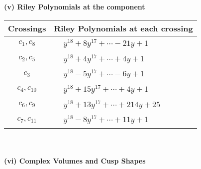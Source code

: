 \documentclass[1p]{elsarticle_modified}
\theoremstyle{definition}
\begin{document}
\newpage\renewcommand{\arraystretch}{1}
\flushleft \textbf{(v) Riley Polynomials at the component}\newline \\
\begin{tabular}{m{50pt}|m{274pt}}
Crossings & \hspace{64pt}Riley Polynomials at each crossing \\
\hline $$\begin{aligned}c_{1},c_{8}\end{aligned}$$&$\begin{aligned}
&y^{18}+8 y^{17}+\cdots-21 y+1
\end{aligned}$\\
\hline $$\begin{aligned}c_{2},c_{5}\end{aligned}$$&$\begin{aligned}
&y^{18}+4 y^{17}+\cdots+4 y+1
\end{aligned}$\\
\hline $$\begin{aligned}c_{3}\end{aligned}$$&$\begin{aligned}
&y^{18}-5 y^{17}+\cdots-6 y+1
\end{aligned}$\\
\hline $$\begin{aligned}c_{4},c_{10}\end{aligned}$$&$\begin{aligned}
&y^{18}+15 y^{17}+\cdots+4 y+1
\end{aligned}$\\
\hline $$\begin{aligned}c_{6},c_{9}\end{aligned}$$&$\begin{aligned}
&y^{18}+13 y^{17}+\cdots+214 y+25
\end{aligned}$\\
\hline $$\begin{aligned}c_{7},c_{11}\end{aligned}$$&$\begin{aligned}
&y^{18}-8 y^{17}+\cdots+11 y+1
\end{aligned}$\\
\hline
\end{tabular}\\~\\
\newpage\flushleft \textbf{(vi) Complex Volumes and Cusp Shapes}
\end{document}
